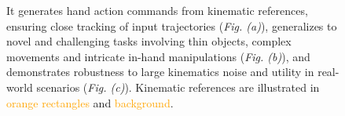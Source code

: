 \begin{figure}[htbp]
{    \textcolor{myblue}{
    It generates hand action commands from kinematic references, ensuring 
    close tracking of input trajectories (\emph{Fig. (a)}), generalizes to novel and challenging tasks involving thin objects, complex movements and intricate in-hand manipulations (\emph{Fig. (b)}), 
    and demonstrates robustness to large kinematics noise and utility in real-world scenarios (\emph{Fig. (c)}).
    Kinematic references are illustrated in \textcolor{orange}{orange rectangles} and \textcolor{orange}{background}. 
    }
  }
  \vspace{-1pt}
  \label{fig_intro_teaser}
\end{figure}